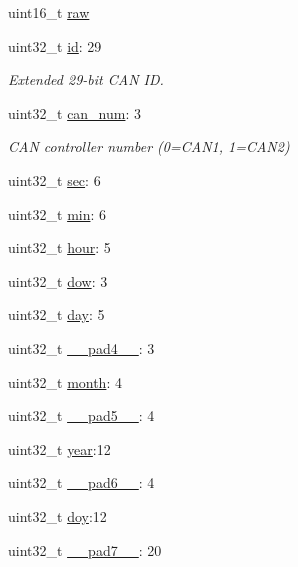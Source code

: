 \begin{DoxyCompactItemize}
\begin{tabbing}
\end{tabbing}\item 
uint16\+\_\+t \hyperlink{struct____attribute_____a6002c78ca3d2dd7e495cb96babc3c2f6}{raw}
\item 
uint32\+\_\+t \hyperlink{struct____attribute_____a87df1990d2a726a8feb9ee5d5fd158d2}{id}\+: 29
\begin{DoxyCompactList}\small\item\em Extended 29-\/bit C\+AN ID. \end{DoxyCompactList}\item 
uint32\+\_\+t \hyperlink{struct____attribute_____a7d526d3c59c97be7b5ef1924151f7de8}{can\+\_\+num}\+: 3
\begin{DoxyCompactList}\small\item\em C\+AN controller number (0=C\+A\+N1, 1=C\+A\+N2) \end{DoxyCompactList}\item 
uint32\+\_\+t \hyperlink{struct____attribute_____a84c6baaec3dc2429942a79d7de07b939}{sec}\+: 6
\item 
uint32\+\_\+t \hyperlink{struct____attribute_____a1620baad6e662539c31b4a82eb5d2bc1}{min}\+: 6
\item 
uint32\+\_\+t \hyperlink{struct____attribute_____a226a28214916e63e3be8b34a904a6fe5}{hour}\+: 5
\item 
uint32\+\_\+t \hyperlink{struct____attribute_____ab9df98376610faf8995ee0f3d7ddd7c3}{dow}\+: 3
\item 
uint32\+\_\+t \hyperlink{struct____attribute_____a4ce9f037a40bdf6b6d6b694790afa28c}{day}\+: 5
\item 
uint32\+\_\+t \hyperlink{struct____attribute_____ad8f8cfaece8486cec76e21cf956d7646}{\+\_\+\+\_\+pad4\+\_\+\+\_\+}\+: 3
\item 
uint32\+\_\+t \hyperlink{struct____attribute_____a59b2a1f42969a6800f7cd16b75ec328f}{month}\+: 4
\item 
uint32\+\_\+t \hyperlink{struct____attribute_____ac9e7d251f898df011d7cc73a8a2559d2}{\+\_\+\+\_\+pad5\+\_\+\+\_\+}\+: 4
\item 
uint32\+\_\+t \hyperlink{struct____attribute_____afb5fa3b09ae735aea92d1a6fa1c6c1c6}{year}\+:12
\item 
uint32\+\_\+t \hyperlink{struct____attribute_____a7f675f9a9d7b33e510c50add172c4108}{\+\_\+\+\_\+pad6\+\_\+\+\_\+}\+: 4
\item 
uint32\+\_\+t \hyperlink{struct____attribute_____ac556a14ae593d1f3d46e166263313c75}{doy}\+:12
\item 
uint32\+\_\+t \hyperlink{struct____attribute_____a41bb8f240ea90dcb866b722bac4b7496}{\+\_\+\+\_\+pad7\+\_\+\+\_\+}\+: 20

\end{DoxyCompactItemize}
